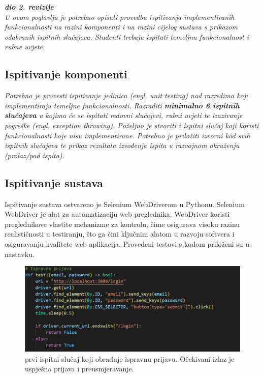 			\textbf{\textit{dio 2. revizije}}\\
			
			 \textit{U ovom poglavlju je potrebno opisati provedbu ispitivanja implementiranih funkcionalnosti na razini komponenti i na razini cijelog sustava s prikazom odabranih ispitnih slučajeva. Studenti trebaju ispitati temeljnu funkcionalnost i rubne uvjete.}
	
			
			\subsection{Ispitivanje komponenti}
			\textit{Potrebno je provesti ispitivanje jedinica (engl. unit testing) nad razredima koji implementiraju temeljne funkcionalnosti. Razraditi \textbf{minimalno 6 ispitnih slučajeva} u kojima će se ispitati redovni slučajevi, rubni uvjeti te izazivanje pogreške (engl. exception throwing). Poželjno je stvoriti i ispitni slučaj koji koristi funkcionalnosti koje nisu implementirane. Potrebno je priložiti izvorni kôd svih ispitnih slučajeva te prikaz rezultata izvođenja ispita u razvojnom okruženju (prolaz/pad ispita). }
			
			 

			\subsection{Ispitivanje sustava}
Ispitivanje sustava ostvareno je Selenium WebDriverom u Pythonu. Selenium WebDriver je alat za automatizaciju web preglednika. WebDriver koristi preglednikove vlastite mehanizme za kontrolu, čime osigurava visoku razinu realističnosti u testiranju, što ga čini ključnim alatom u razvoju softvera i osiguravanju kvalitete web aplikacija. Provedeni testovi s kodom priloženi su u nastavku.


\begin{figure}[htp]
    \includegraphics[scale=0.5]{dijagrami/test1.png}
    \centering
    \caption{prvi ispitni slučaj koji obrađuje ispravnu prijavu. Očekivani izlaz je uspješna prijava i preusmjeravanje.}

\end{figure}

